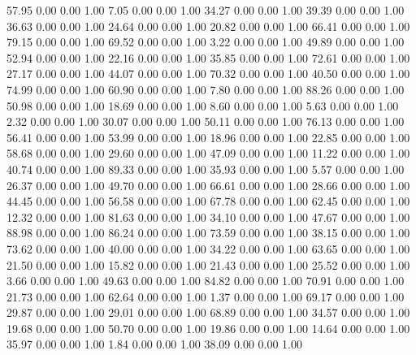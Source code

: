    57.95   0.00   0.00   1.00
    7.05   0.00   0.00   1.00
   34.27   0.00   0.00   1.00
   39.39   0.00   0.00   1.00
   36.63   0.00   0.00   1.00
   24.64   0.00   0.00   1.00
   20.82   0.00   0.00   1.00
   66.41   0.00   0.00   1.00
   79.15   0.00   0.00   1.00
   69.52   0.00   0.00   1.00
    3.22   0.00   0.00   1.00
   49.89   0.00   0.00   1.00
   52.94   0.00   0.00   1.00
   22.16   0.00   0.00   1.00
   35.85   0.00   0.00   1.00
   72.61   0.00   0.00   1.00
   27.17   0.00   0.00   1.00
   44.07   0.00   0.00   1.00
   70.32   0.00   0.00   1.00
   40.50   0.00   0.00   1.00
   74.99   0.00   0.00   1.00
   60.90   0.00   0.00   1.00
    7.80   0.00   0.00   1.00
   88.26   0.00   0.00   1.00
   50.98   0.00   0.00   1.00
   18.69   0.00   0.00   1.00
    8.60   0.00   0.00   1.00
    5.63   0.00   0.00   1.00
    2.32   0.00   0.00   1.00
   30.07   0.00   0.00   1.00
   50.11   0.00   0.00   1.00
   76.13   0.00   0.00   1.00
   56.41   0.00   0.00   1.00
   53.99   0.00   0.00   1.00
   18.96   0.00   0.00   1.00
   22.85   0.00   0.00   1.00
   58.68   0.00   0.00   1.00
   29.60   0.00   0.00   1.00
   47.09   0.00   0.00   1.00
   11.22   0.00   0.00   1.00
   40.74   0.00   0.00   1.00
   89.33   0.00   0.00   1.00
   35.93   0.00   0.00   1.00
    5.57   0.00   0.00   1.00
   26.37   0.00   0.00   1.00
   49.70   0.00   0.00   1.00
   66.61   0.00   0.00   1.00
   28.66   0.00   0.00   1.00
   44.45   0.00   0.00   1.00
   56.58   0.00   0.00   1.00
   67.78   0.00   0.00   1.00
   62.45   0.00   0.00   1.00
   12.32   0.00   0.00   1.00
   81.63   0.00   0.00   1.00
   34.10   0.00   0.00   1.00
   47.67   0.00   0.00   1.00
   88.98   0.00   0.00   1.00
   86.24   0.00   0.00   1.00
   73.59   0.00   0.00   1.00
   38.15   0.00   0.00   1.00
   73.62   0.00   0.00   1.00
   40.00   0.00   0.00   1.00
   34.22   0.00   0.00   1.00
   63.65   0.00   0.00   1.00
   21.50   0.00   0.00   1.00
   15.82   0.00   0.00   1.00
   21.43   0.00   0.00   1.00
   25.52   0.00   0.00   1.00
    3.66   0.00   0.00   1.00
   49.63   0.00   0.00   1.00
   84.82   0.00   0.00   1.00
   70.91   0.00   0.00   1.00
   21.73   0.00   0.00   1.00
   62.64   0.00   0.00   1.00
    1.37   0.00   0.00   1.00
   69.17   0.00   0.00   1.00
   29.87   0.00   0.00   1.00
   29.01   0.00   0.00   1.00
   68.89   0.00   0.00   1.00
   34.57   0.00   0.00   1.00
   19.68   0.00   0.00   1.00
   50.70   0.00   0.00   1.00
   19.86   0.00   0.00   1.00
   14.64   0.00   0.00   1.00
   35.97   0.00   0.00   1.00
    1.84   0.00   0.00   1.00
   38.09   0.00   0.00   1.00
